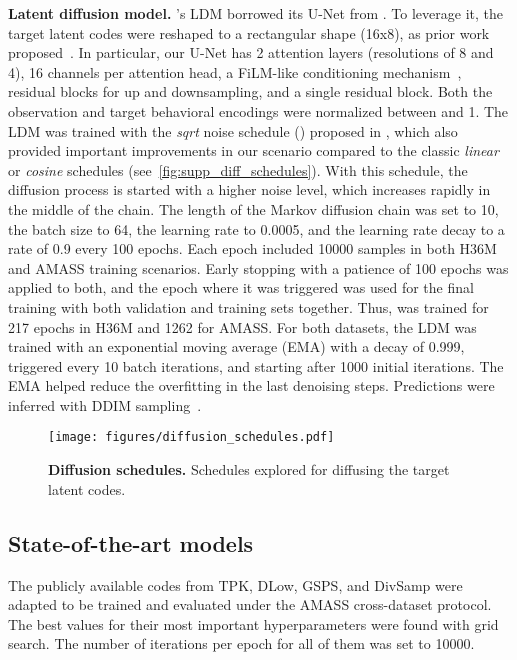 \documentclass[10pt,twocolumn,letterpaper]{article}
\begin{document}
\textbf{Latent diffusion model.} 
\modelname{}'s LDM borrowed its U-Net from \cite{dhariwal2021diffusionbeatsgans}. To leverage it, the target latent codes were reshaped to a rectangular shape (16x8), as prior work proposed~\cite{bautista2022gaudi}. In particular, our U-Net has 2 attention layers (resolutions of 8 and 4), 16 channels per attention head, a FiLM-like conditioning mechanism~\cite{perez2018film}, residual blocks for up and downsampling, and a single residual block. Both the observation and target behavioral encodings were normalized between  and 1. 
The LDM was trained with the \textit{sqrt} noise schedule () proposed in \cite{li2022diffusionLM}, which also provided important improvements in our scenario compared to the classic \textit{linear} or \textit{cosine} schedules (see~\autoref{fig:supp_diff_schedules}). With this schedule, the diffusion process is started with a higher noise level, which increases rapidly in the middle of the chain.
The length of the Markov diffusion chain was set to 10, the batch size to 64, the learning rate to 0.0005, and the learning rate decay to a rate of 0.9 every 100 epochs. Each epoch included 10000 samples in both H36M and AMASS training scenarios. Early stopping with a patience of 100 epochs was applied to both, and the epoch where it was triggered was used for the final training with both validation and training sets together. Thus, \modelname{} was trained for 217 epochs in H36M and 1262 for AMASS. For both datasets, the LDM was trained with an exponential moving average (EMA) with a decay of 0.999, triggered every 10 batch iterations, and starting after 1000 initial iterations. The EMA helped reduce the overfitting in the last denoising steps. Predictions were inferred with DDIM sampling~\cite{song2021ddim}. 

\begin{figure}[t!]
    \centering
    \texttt{[image: figures/diffusion\_schedules.pdf]}
    \caption{\textbf{Diffusion schedules. } Schedules explored for diffusing the target latent codes.}
    \label{fig:supp_diff_schedules}
\end{figure}

\subsection{State-of-the-art models}
\label{subsec:supp_implementation_sota}

The publicly available codes from TPK, DLow, GSPS, and DivSamp were adapted to be trained and evaluated under the AMASS cross-dataset protocol. The best values for their most important hyperparameters were found with grid search. The number of iterations per epoch for all of them was set to 10000.
\end{document}
